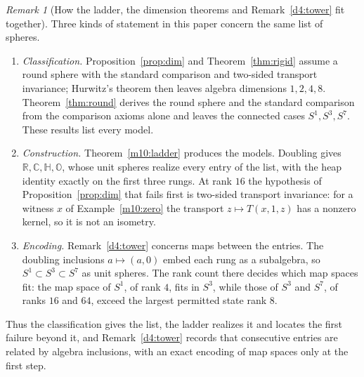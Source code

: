 \documentclass[11pt,reqno]{amsart}
\theoremstyle{definition}
\theoremstyle{remark}
\newtheorem{remark}[theorem]{Remark}
\numberwithin{equation}{section}
\newcommand{\R}{\mathbb{R}}
\newcommand{\C}{\mathbb{C}}
\newcommand{\HH}{\mathbb{H}}
\begin{document}
\begin{remark}[How the ladder, the dimension theorems and Remark~\ref{d4:tower} fit together]\label{m10:fit}
Three kinds of statement in this paper concern the same list of spheres.
\begin{enumerate}[label=(\alph*)]
\item \emph{Classification.} Proposition~\ref{prop:dim} and
Theorem~\ref{thm:rigid} assume a round sphere with the standard
comparison and two-sided transport invariance; Hurwitz's theorem then
leaves algebra dimensions \(1,2,4,8\). Theorem~\ref{thm:round} derives
the round sphere and the standard comparison from the comparison axioms
alone and leaves the connected cases \(S^1,S^3,S^7\). These results list
every model.
\item \emph{Construction.} Theorem~\ref{m10:ladder} produces the models.
Doubling gives \(\R,\C,\HH,\mathbb O\), whose unit spheres realize every
entry of the list, with the heap identity exactly on the first three
rungs. At rank \(16\) the hypothesis of Proposition~\ref{prop:dim} that
fails first is two-sided transport invariance: for a witness \(x\) of
Example~\ref{m10:zero} the transport \(z\mapsto T(x,1,z)\) has a
nonzero kernel, so it is not an isometry.
\item \emph{Encoding.} Remark~\ref{d4:tower} concerns maps between the
entries. The doubling inclusions \(a\mapsto(a,0)\) embed each rung as a
subalgebra, so \(S^1\subset S^3\subset S^7\) as unit spheres. The rank
count there decides which map spaces fit: the map space of \(S^1\), of
rank \(4\), fits in \(S^3\), while those of \(S^3\) and \(S^7\), of ranks
\(16\) and \(64\), exceed the largest permitted state rank \(8\).
\end{enumerate}
Thus the classification gives the list, the ladder realizes it and
locates the first failure beyond it, and Remark~\ref{d4:tower} records
that consecutive entries are related by algebra inclusions, with an
exact encoding of map spaces only at the first step.
\end{remark}
\end{document}
